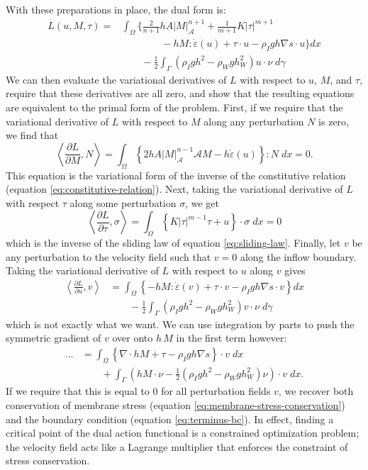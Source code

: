 \documentclass[twocolumn,letterpaper]{igs}
\begin{document}
With these preparations in place, the dual form is:
\begin{align}
    L(u, M, \tau) = & \int_\Omega\Bigg\{\frac{2}{n + 1}hA|M|_{\mathscr A}^{n + 1} + \frac{1}{m + 1}K|\tau|^{m + 1} \nonumber\\
    & \qquad\qquad - hM:\dot\varepsilon(u) + \tau\cdot u - \rho_Igh\nabla s\cdot u\Bigg\}dx \nonumber \\
    & \qquad - \frac{1}{2}\int_\Gamma\left(\rho_Igh^2 - \rho_Wgh_W^2\right)u\cdot\nu\;d\gamma
    \label{eq:ssa-dual-form}
\end{align}
We can then evaluate the variational derivatives of $L$ with respect to $u$, $M$, and $\tau$, require that these derivatives are all zero, and show that the resulting equations are equivalent to the primal form of the problem.
First, if we require that the variational derivative of $L$ with respect to $M$ along any perturbation $N$ is zero, we find that
\begin{equation}
    \left\langle\frac{\partial L}{\partial M}, N\right\rangle = \int_\Omega\left\{2hA|M|_{\mathscr{A}}^{n - 1}\mathscr{A}M - h\dot\varepsilon(u)\right\} : N\; dx = 0.
\end{equation}
This equation is the variational form of the inverse of the constitutive relation (equation \eqref{eq:constitutive-relation}).
Next, taking the variational derivative of $L$ with respect $\tau$ along some perturbation $\sigma$, we get
\begin{equation}
    \left\langle\frac{\partial L}{\partial\tau}, \sigma\right\rangle = \int_\Omega\left\{K|\tau|^{m - 1}\tau + u\right\}\cdot\sigma\;dx = 0
\end{equation}
which is the inverse of the sliding law of equation \eqref{eq:sliding-law}.
Finally, let $v$ be any perturbation to the velocity field such that $v = 0$ along the inflow boundary.
Taking the variational derivative of $L$ with respect to $u$ along $v$ gives
\begin{align}
    \left\langle\frac{\partial L}{\partial u}, v\right\rangle & = \int_\Omega\left\{-hM : \dot\varepsilon(v) + \tau\cdot v - \rho_Igh\nabla s\cdot v\right\}dx \nonumber\\
    & \qquad -\frac{1}{2}\int_{\Gamma}\left(\rho_Igh^2 - \rho_Wgh_W^2\right)v\cdot\nu\;d\gamma
\end{align}
which is not exactly what we want.
We can use integration by parts to push the symmetric gradient of $v$ over onto $h\,M$ in the first term however:
\begin{align}
    \ldots & = \int_\Omega\left\{\nabla\cdot hM + \tau - \rho_Igh\nabla s\right\}\cdot v\;dx \\
    & \qquad + \int_\Gamma\left(hM\cdot\nu - \frac{1}{2}\left(\rho_Igh^2 - \rho_Wgh_W^2\right)\nu\right)\cdot v\;dx.
\end{align}
If we require that this is equal to 0 for all perturbation fields $v$, we recover both conservation of membrane stress (equation \eqref{eq:membrane-stress-conservation}) and the boundary condition (equation \eqref{eq:terminus-bc}).
In effect, finding a critical point of the dual action functional is a constrained optimization problem; the velocity field acts like a Lagrange multiplier that enforces the constraint of stress conservation.
\end{document}
